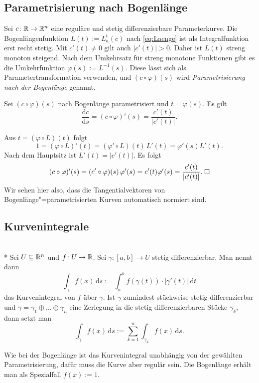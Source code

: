 \subsection{Parametrisierung nach Bogenlänge}

Sei $c\colon\mathbb R\to\mathbb R^n$ eine reguläre und stetig differenzierbare
Parameterkurve. Die Bogenlängenfunktion $L(t):=L_a^t(c)$ nach
\eqref{eq:Laenge} ist als Integralfunktion erst recht stetig.
Mit $c'(t)\ne 0$ gilt auch $|c'(t)|>0$. Daher ist $L(t)$ streng monoton
steigend. Nach dem Umkehrsatz für streng monotone Funktionen gibt es
die Umkehrfunktion $\varphi(s):=L^{-1}(s)$. Diese lässt sich als
Parametertransformation verwenden, und $(c\circ\varphi)(s)$ wird
\emph{Parametrisierung nach der Bogenlänge} genannt.

\begin{corollary}
Sei $(c\circ\varphi)(s)$ nach Bogenlänge parametrisiert
und $t=\varphi(s)$. Es gilt
\begin{equation}
\frac{\mathrm dc}{\mathrm ds} =
(c\circ\varphi)'(s) = \frac{c'(t)}{|c'(t)|}.
\end{equation}
\end{corollary}
\noindent{}
Aus $t=(\varphi\circ L)(t)$ folgt
\begin{equation}
1 = (\varphi\circ L)'(t) = (\varphi'\circ L)(t)\,L'(t) = \varphi'(s)L'(t).
\end{equation}
Nach dem Hauptsitz ist $L'(t)=|c'(t)|$. Es folgt
\begin{equation}
(c\circ\varphi)'(s) = (c'\circ\varphi)(s)\,\varphi'(s) = c'(t)\varphi'(s)
= \frac{c'(t)}{|c'(t)|}.\;\Box
\end{equation}
Wir sehen hier also, dass die Tangentialvektoren von
Bogenlänge"=parametrisierten Kurven automatisch normiert sind.

\subsection{Kurvenintegrale}
\begin{definition}%
\mbox{}\\*
Sei $U\subseteq\mathbb R^n$ und $f\colon U\to\mathbb R$.
Sei $\gamma\colon [a,b]\to U$ stetig differenzierbar. Man nennt dann%
\[\int_\gamma f(x)\,\mathrm ds := \int_a^b f(\gamma(t))\cdot |\gamma'(t)|\,\mathrm dt\]
das Kurvenintegral von $f$ über $\gamma$.
Ist $\gamma$ zumindest stückweise stetig differenzierbar und
$\gamma = \gamma_1\oplus\ldots\oplus\gamma_n$ eine Zerlegung
in die stetig differenzierbaren Stücke $\gamma_k$, dann setzt man%
\[\int_\gamma f(x)\,\mathrm ds := \sum_{k=1}^n \int_{\gamma_k} f(x)\,\mathrm ds.\]
\end{definition}
Wie bei der Bogenlänge ist das Kurvenintegral unabhängig von
der gewählten Parametrisierung, dafür muss die Kurve aber regulär sein.
Die Bogenlänge erhält man als Spezialfall $f(x):=1$.

